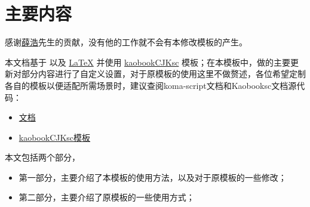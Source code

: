 \setchapterpreamble[u]{\margintoc}
\chapter{主要内容}

感谢\href{https://github.com/xuehao}{薛浩}先生的贡献，没有他的工作就不会有本修改模板的产生。

本文档基于 \href{https://sourceforge.net/projects/koma-script/}{\KOMAScript} 以及 \href{https://www.latex-project.org/}{\LaTeX} 并使用 \href{https://github.com/xuehao/kaobookCJKsc}{kaobookCJKsc} 模板；在本模板中，做的主要更新对部分内容进行了自定义设置，对于原模板的使用这里不做赘述，各位希望定制各自的模板以便适配所需场景时，建议查阅koma-script文档和Kaobooksc文档源代码：

\begin{itemize}
    \item \href{https://sourceforge.net/projects/koma-script/}{\KOMAScript 文档}
    \item \href{https://github.com/xuehao/kaobookCJKsc}{kaobookCJKsc模板} 
\end{itemize}

本文包括两个部分，

\begin{itemize}
	\item 第一部分，主要介绍了本模板的使用方法，以及对于原模板的一些修改；
	\item 第二部分，主要介绍了原模板的一些使用方式；
\end{itemize}

